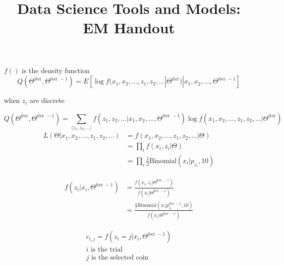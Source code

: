\documentclass{exam}
\title{Data Science Tools and Models: EM Handout}
\date{}
\begin{document}
\maketitle

$f()$ is the density function
	$$Q(\Theta^{\textrm{iter}}, \Theta^{\textrm{iter }-1}) = E \left[ \log f (x_1, x_2, ..., z_1, z_2, ... | \Theta^{\textrm{iter}}) |
			x_1,  x_2, ..., \Theta^{\textrm{iter }-1} \right]$$

when $z_i$ are discrete

		$$Q(\Theta^{\textrm{iter}}, \Theta^{\textrm{iter }-1}) =
			\sum_{\langle z_1, z_2, ... \rangle} f (z_1, z_2, ... | x_1,  x_2, ..., \Theta^{\textrm{iter }-1}) 
				\log f (x_1, x_2, ..., z_1, z_2, ... | \Theta^{\textrm{iter}})$$
	\begin{align}
	L (\Theta | x_1, x_2, ..., z_1, z_2, ...) &= f (x_1, x_2, ..., z_1, z_2, ... | \Theta) \nonumber \\
		&= \prod_i f (x_i, z_i | \Theta) \nonumber \\
		&= \prod_i \frac{1}{2} \textrm {Binomial}(x_i | p_{z_i}, 10) \nonumber
	\end{align}


	\begin{align}
	f (z_i | x_i, \Theta^{\textrm{iter }-1}) &= 
		\frac{f (x_i, z_i | \Theta^{\textrm{iter }-1})}
		{f (x_i | \Theta^{\textrm{iter }-1})} \nonumber \\
	&= \frac{\frac{1}{2} \textrm {Binomial}(x_i | p_{z_i}^{\textrm{iter }-1}, 10)}
		{f (x_i | \Theta^{\textrm{iter }-1})} \nonumber
	\end{align}

	\begin{align}
c_{i, j} = f (z_i = j | x_i, \Theta^{\textrm{iter }-1})  \nonumber \\
i \textrm{ is the trial} \nonumber \\
j \textrm{ is the selected coin} \nonumber \\
	\end{align}
\vspace{2 em}
\end{document}
